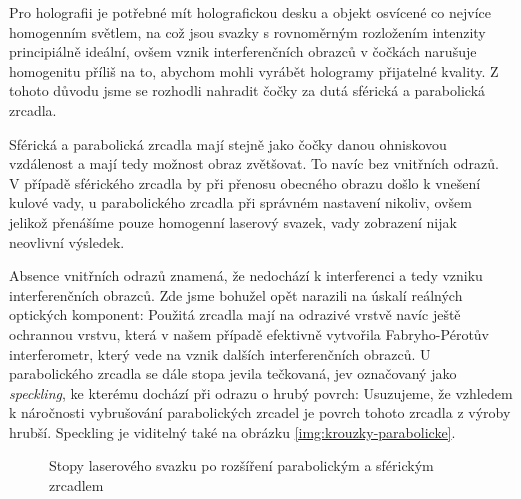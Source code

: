 \documentclass[twoside,project]{../MFFPrace}
\begin{document}
\medskip

Pro holografii je potřebné mít holografickou desku a objekt osvícené co nejvíce homogenním světlem, na což jsou svazky s rovnoměrným rozložením intenzity principiálně ideální, ovšem vznik interferenčních obrazců v čočkách narušuje homogenitu příliš na to, abychom mohli vyrábět hologramy přijatelné kvality. Z tohoto důvodu jsme se rozhodli nahradit čočky za dutá sférická a parabolická zrcadla.

Sférická a parabolická zrcadla mají stejně jako čočky danou ohniskovou vzdálenost a mají tedy možnost obraz zvětšovat. To navíc bez vnitřních odrazů. V případě sférického zrcadla by při přenosu obecného obrazu došlo k vnešení kulové vady, u parabolického zrcadla při správném nastavení nikoliv, ovšem jelikož přenášíme pouze homogenní laserový svazek, vady zobrazení nijak neovlivní výsledek.

Absence vnitřních odrazů znamená, že nedochází k interferenci a tedy vzniku interferenčních obrazců. Zde jsme bohužel opět narazili na úskalí reálných optických komponent: Použitá zrcadla mají na odrazivé vrstvě navíc ještě ochrannou vrstvu, která v našem případě efektivně vytvořila Fabryho-Pérotův interferometr, který vede na vznik dalších interferenčních obrazců. U parabolického zrcadla se dále stopa jevila tečkovaná, jev označovaný jako \textit{speckling}, ke kterému dochází při odrazu o hrubý povrch: Usuzujeme, že vzhledem k náročnosti vybrušování parabolických zrcadel je povrch tohoto zrcadla z výroby hrubší. Speckling je viditelný také na obrázku \ref{img:krouzky-parabolicke}.

\medskip

\begin{figure}
    \hfill
    \caption{Stopy laserového svazku po rozšíření parabolickým a sférickým zrcadlem}
    \label{img:krouzky}
\end{figure}
\end{document}
